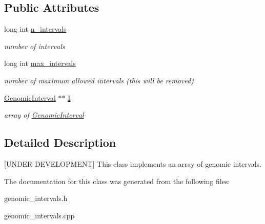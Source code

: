 \subsection*{Public Attributes}
\begin{CompactItemize}
\item 
\hypertarget{classGenomicIntervalSetAsArray_9f9558bbaa8d682993a60fa142893998}{
long int \hyperlink{classGenomicIntervalSetAsArray_9f9558bbaa8d682993a60fa142893998}{n\_\-intervals}}
\label{classGenomicIntervalSetAsArray_9f9558bbaa8d682993a60fa142893998}

\begin{CompactList}\small\item\em number of intervals \item\end{CompactList}\item 
\hypertarget{classGenomicIntervalSetAsArray_6580b875cd9804ba59f88c5000f83f09}{
long int \hyperlink{classGenomicIntervalSetAsArray_6580b875cd9804ba59f88c5000f83f09}{max\_\-intervals}}
\label{classGenomicIntervalSetAsArray_6580b875cd9804ba59f88c5000f83f09}

\begin{CompactList}\small\item\em number of maximum allowed intervals (this will be removed) \item\end{CompactList}\item 
\hypertarget{classGenomicIntervalSetAsArray_f7ec8bbfea7748695aa35e6ec467a4b2}{
\hyperlink{classGenomicInterval}{GenomicInterval} $\ast$$\ast$ \hyperlink{classGenomicIntervalSetAsArray_f7ec8bbfea7748695aa35e6ec467a4b2}{I}}
\label{classGenomicIntervalSetAsArray_f7ec8bbfea7748695aa35e6ec467a4b2}

\begin{CompactList}\small\item\em array of \hyperlink{classGenomicInterval}{GenomicInterval} \item\end{CompactList}\end{CompactItemize}


\subsection{Detailed Description}
\mbox{[}UNDER DEVELOPMENT\mbox{]} This class implements an array of genomic intervals. 

The documentation for this class was generated from the following files:\begin{CompactItemize}
\item 
genomic\_\-intervals.h\item 
genomic\_\-intervals.cpp\end{CompactItemize}

